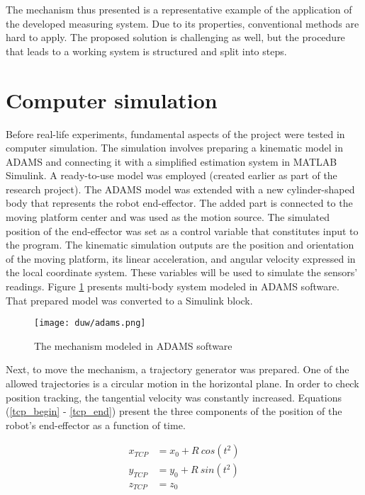 The mechanism thus presented is a representative example of the application of the developed measuring system. Due to its properties, conventional methods are hard to apply. The proposed solution is challenging as well, but the procedure that leads to a working system is structured and split into steps. 

\section{Computer simulation}

Before real-life experiments, fundamental aspects of the project were tested in computer simulation. The simulation involves preparing a kinematic model in ADAMS and connecting it with a simplified estimation system in MATLAB Simulink. A ready-to-use model was employed (created earlier as part of the research project). The ADAMS model was extended with a new cylinder-shaped body that represents the robot end-effector. The added part is connected to the moving platform center and was used as the motion source. The simulated position of the end-effector was set as a control variable that constitutes input to the program. The kinematic simulation outputs are the position and orientation of the moving platform, its linear acceleration, and angular velocity expressed in the local coordinate system. These variables will be used to simulate the sensors' readings. Figure \ref{adams} presents multi-body system modeled in ADAMS software. That prepared model was converted to a Simulink block.

\begin{figure}[!h]
	\centering
	\texttt{[image: duw/adams.png]}
	\caption{The mechanism modeled in ADAMS software}
	\label{adams}
\end{figure}

Next, to move the mechanism, a trajectory generator was prepared. One of the allowed trajectories is a circular motion in the horizontal plane. In order to check position tracking, the tangential velocity was constantly increased. Equations (\ref{tcp_begin} - \ref{tcp_end}) present the three components of the position of the robot's end-effector as a function of time.

\begin{align}
	x_{TCP} &= x_0 +  R\ cos( t^2 )
	\label{tcp_begin}\\
	y_{TCP} &= y_0  + R\ sin( t^2 )\\
	z_{TCP} &= z_0
	\label{tcp_end}
\end{align}

